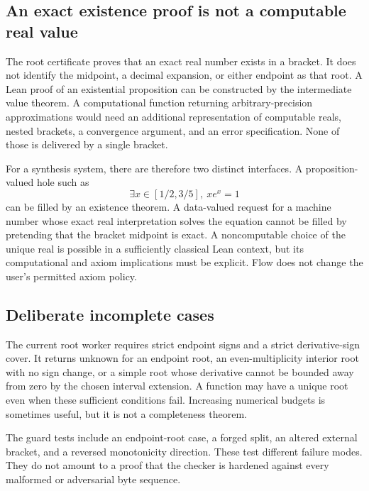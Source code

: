 \subsection{An exact existence proof is not a computable real value}

The root certificate proves that an exact real number exists in a bracket. It does not identify the midpoint, a decimal expansion, or either endpoint as that root. A Lean proof of an existential proposition can be constructed by the intermediate value theorem. A computational function returning arbitrary-precision approximations would need an additional representation of computable reals, nested brackets, a convergence argument, and an error specification. None of those is delivered by a single bracket.

For a synthesis system, there are therefore two distinct interfaces. A proposition-valued hole such as
\[
 \exists x\in[1/2,3/5],\ xe^x=1
\]
can be filled by an existence theorem. A data-valued request for a machine number whose exact real interpretation solves the equation cannot be filled by pretending that the bracket midpoint is exact. A noncomputable choice of the unique real is possible in a sufficiently classical Lean context, but its computational and axiom implications must be explicit. Flow does not change the user's permitted axiom policy.

\subsection{Deliberate incomplete cases}

The current root worker requires strict endpoint signs and a strict derivative-sign cover. It returns unknown for an endpoint root, an even-multiplicity interior root with no sign change, or a simple root whose derivative cannot be bounded away from zero by the chosen interval extension. A function may have a unique root even when these sufficient conditions fail. Increasing numerical budgets is sometimes useful, but it is not a completeness theorem.

The guard tests include an endpoint-root case, a forged split, an altered external bracket, and a reversed monotonicity direction. These test different failure modes. They do not amount to a proof that the checker is hardened against every malformed or adversarial byte sequence.
